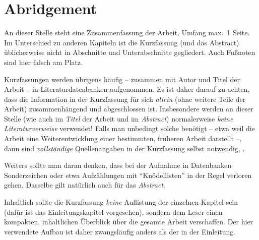 
\chapter{Abridgement}

An dieser Stelle steht eine Zusammenfassung der Arbeit, Umfang
max.\ 1 Seite. Im Unterschied zu anderen Kapiteln ist die
Kurzfassung (und das Abstract) üblicherweise nicht in Abschnitte
und Unterabschnitte gegliedert. 
Auch Fußnoten sind hier falsch am Platz.

Kurzfassungen werden übrigens häufig -- zusammen mit Autor und Titel
der Arbeit -- %
in Literaturdatenbanken aufgenommen. Es ist daher darauf zu
achten, dass die Information in der Kurzfassung für sich 
\emph{allein} (\dah ohne weitere Teile der Arbeit) zusammenhängend und
abgeschlossen ist. Insbesondere werden an dieser Stelle (wie \ua
auch im \emph{Titel} der Arbeit und im \emph{Abstract})
normalerweise \emph{keine Literaturverweise} verwendet! Falls man
unbedingt solche benötigt -- etwa weil die Arbeit eine
Weiterentwicklung einer bestimmten, früheren Arbeit darstellt --,
dann sind \emph{vollständige} Quellenangaben in der Kurzfassung
selbst notwendig, .

Weiters sollte man daran denken, dass bei der Aufnahme in Datenbanken
Sonderzeichen oder etwa Aufzählungen mit "`Knödellisten"' in der
Regel verloren gehen. Dasselbe gilt natürlich auch für das 
\emph{Abstract}.


Inhaltlich sollte die Kurzfassung \emph{keine} Auflistung der
einzelnen Kapitel sein (dafür ist das Einleitungskapitel
vorgesehen), sondern dem Leser einen kompakten, inhaltlichen
Überblick über die gesamte Arbeit verschaffen. Der hier verwendete
Aufbau ist daher zwangsläufig anders als der in der Einleitung.
